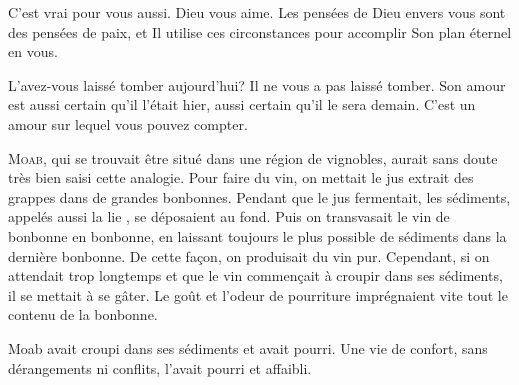 C'est vrai pour vous aussi. Dieu vous aime.
 Les pensées de Dieu envers vous sont des pensées de paix,
 et Il utilise ces circonstances pour accomplir Son plan éternel en vous. 

L'avez-vous laissé tomber aujourd'hui? Il ne vous a pas laissé tomber.
 Son amour est aussi certain qu'il l'était hier,
 aussi certain qu'il le sera demain.
 C'est un amour sur lequel vous pouvez compter. 

\dvrule









\lettrine{M}{oab,} qui se trouvait être situé
 dans une région de vignobles, aurait sans doute très bien saisi
 cette analogie. Pour faire du vin, on mettait le jus extrait des grappes
 dans de grandes bonbonnes. Pendant que le jus fermentait, les sédiments,
 appelés aussi \Og la lie \Fg{}, se déposaient au fond.
 Puis on transvasait le vin de bonbonne en bonbonne, en laissant toujours
 le plus possible de sédiments dans la dernière bonbonne.
 De cette fa\c{c}on, on produisait du vin pur.
 Cependant, si on attendait trop longtemps et que le vin commen\c{c}ait à croupir
 dans ses sédiments, il se mettait à se gâter.
 Le goût et l'odeur de pourriture imprégnaient
 vite tout le contenu de la bonbonne. 

Moab avait croupi dans ses sédiments et avait pourri.
 Une vie de confort, sans dérangements ni conflits,
 l'avait pourri et affaibli. 

